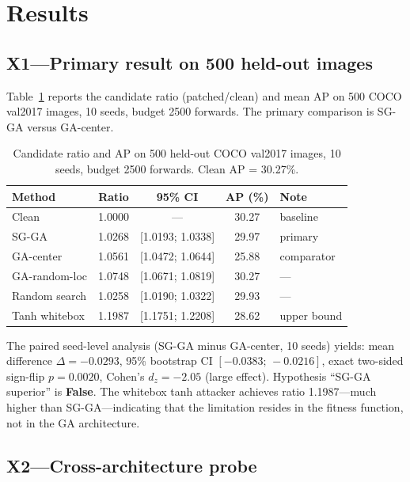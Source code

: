 \documentclass[a4paper,fleqn]{cas-dc}
\begin{document}
\section{Results}

\subsection{X1---Primary result on 500 held-out images}

Table~\ref{tab:x1_main} reports the candidate ratio (patched/clean) and mean AP on 500 COCO val2017 images, 10 seeds, budget 2500 forwards. The primary comparison is SG-GA versus GA-center.

\begin{table}[t]
\centering
\caption{Candidate ratio and AP on 500 held-out COCO val2017 images, 10 seeds, budget 2500 forwards. Clean AP = 30.27\%.}
\label{tab:x1_main}
\small
\begin{tabular}{lcccp{3.5cm}}
\toprule
\textbf{Method} & \textbf{Ratio} & \textbf{95\% CI} & \textbf{AP (\%)} & \textbf{Note} \\
\midrule
Clean & 1.0000 & --- & 30.27 & baseline \\
SG-GA & 1.0268 & [1.0193; 1.0338] & 29.97 & primary \\
GA-center & 1.0561 & [1.0472; 1.0644] & 25.88 & comparator \\
GA-random-loc & 1.0748 & [1.0671; 1.0819] & 30.27 & --- \\
Random search & 1.0258 & [1.0190; 1.0322] & 29.93 & --- \\
Tanh whitebox & 1.1987 & [1.1751; 1.2208] & 28.62 & upper bound \\
\bottomrule
\end{tabular}
\end{table}

The paired seed-level analysis (SG-GA minus GA-center, 10 seeds) yields: mean difference $\Delta = -0.0293$, 95\% bootstrap CI $[-0.0383;\,-0.0216]$, exact two-sided sign-flip $p = 0.0020$, Cohen's $d_z = -2.05$ (large effect). Hypothesis ``SG-GA superior'' is \textbf{False}. The whitebox tanh attacker achieves ratio 1.1987---much higher than SG-GA---indicating that the limitation resides in the fitness function, not in the GA architecture.

\subsection{X2---Cross-architecture probe}
\end{document}
